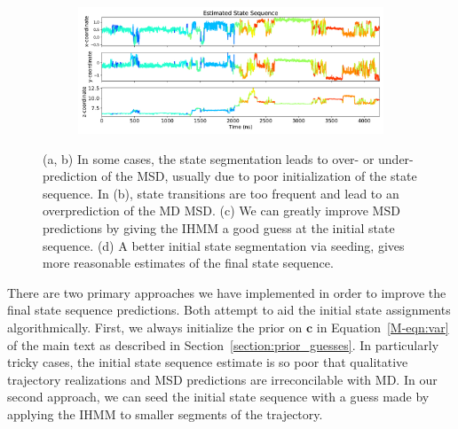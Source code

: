 \documentclass{article}
\begin{document}
\begin{figure}
\begin{subfigure}{0.35\textwidth}
  \caption{}\label{fig:msd_improvement}
  \end{subfigure}
  \begin{subfigure}{0.63\textwidth}
  \includegraphics[width=\textwidth]{state_sequence_after_ACH_21.pdf}
  \caption{}\label{fig:state_sequence_after}
  \end{subfigure}
  \caption{(a, b) In some cases, the state segmentation leads to over- or 
  under-prediction of the MSD, usually due to poor initialization of the state
  sequence. In (b), state transitions are too frequent and lead to an
  overprediction of the MD MSD. (c) We can greatly improve MSD predictions by
  giving the IHMM a good guess at the initial state sequence. (d) A better
  initial state segmentation via seeding, gives more reasonable estimates
  of the final state sequence.}\label{fig:improvement_state_sequence}
  \end{figure}
  
  There are two primary approaches we have implemented in order to improve the final 
  state sequence predictions. Both attempt to aid the initial state assignments 
  algorithmically. First, we always initialize the prior on $\mathbf{c}$ in 
  Equation~\ref{M-eqn:var} of the main text as described in 
  Section~\ref{section:prior_guesses}. In particularly tricky cases, the initial
  state sequence estimate is so poor that qualitative trajectory realizations
  and MSD predictions are irreconcilable with MD. In our second approach, we can
  seed the initial state sequence with a guess made by applying the IHMM to 
  smaller segments of the trajectory. 
  
\end{document}
